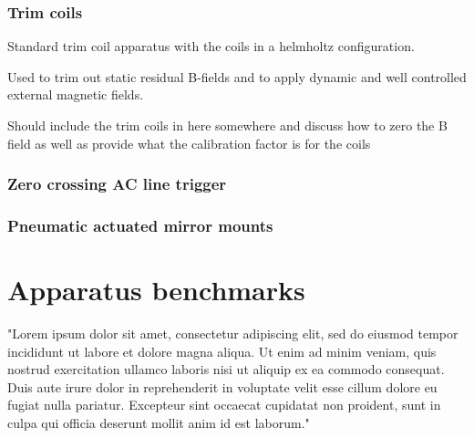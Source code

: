 \subsubsection{Trim coils}

Standard trim coil apparatus with the coils in a helmholtz configuration.

Used to trim out static residual B-fields and to apply dynamic and well controlled external magnetic fields.

Should include the trim coils in here somewhere and discuss how to zero the B field as well as provide what the calibration factor is for the coils

\subsubsection{Zero crossing AC line trigger}

\subsubsection{Pneumatic actuated mirror mounts}

\section{Apparatus benchmarks}
\label{sec:app_scores}

"Lorem ipsum dolor sit amet, consectetur adipiscing elit, sed do eiusmod tempor incididunt ut labore et dolore magna aliqua. Ut enim ad minim veniam, quis nostrud exercitation ullamco laboris nisi ut aliquip ex ea commodo consequat. Duis aute irure dolor in reprehenderit in voluptate velit esse cillum dolore eu fugiat nulla pariatur. Excepteur sint occaecat cupidatat non proident, sunt in culpa qui officia deserunt mollit anim id est laborum."